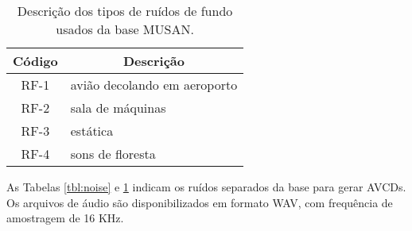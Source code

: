 \begin{table} [H]
    \centering
    \caption{Descrição dos tipos de ruídos de fundo usados da base MUSAN.}
    \label{tbl:noise-bg}
    \begin{tabular}{c|l}

        \multicolumn{1}{c|}{\textbf{Código}} & \multicolumn{1}{c}{\textbf{Descrição}} \\
        \hline 

        RF-1 & avião decolando em aeroporto \\
        RF-2 & sala de máquinas \\
        RF-3 & estática \\
        RF-4 & sons de floresta \\

    \end{tabular}
\end{table}

As Tabelas \ref{tbl:noise} e \ref{tbl:noise-bg} indicam os ruídos separados da base para gerar AVCDs.
Os arquivos de áudio são disponibilizados em formato WAV, com frequência de amostragem de 16 KHz. 